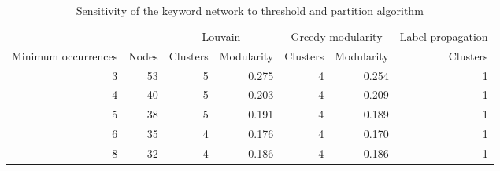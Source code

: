 \begin{table}[!ht]
\caption{Sensitivity of the keyword network to threshold and partition algorithm}
\centering
\small
\begin{tabular}{@{}rrrrrrr@{}}
\toprule
 & & \multicolumn{2}{c}{Louvain} & \multicolumn{2}{c}{Greedy modularity} & Label propagation \\
\cmidrule(lr){3-4}\cmidrule(lr){5-6}\cmidrule(lr){7-7}
Minimum occurrences & Nodes & Clusters & Modularity & Clusters & Modularity & Clusters \\
\midrule
3 & 53 & 5 & 0.275 & 4 & 0.254 & 1 \\
4 & 40 & 5 & 0.203 & 4 & 0.209 & 1 \\
5 & 38 & 5 & 0.191 & 4 & 0.189 & 1 \\
6 & 35 & 4 & 0.176 & 4 & 0.170 & 1 \\
8 & 32 & 4 & 0.186 & 4 & 0.186 & 1 \\
\bottomrule
\end{tabular}
\end{table}
